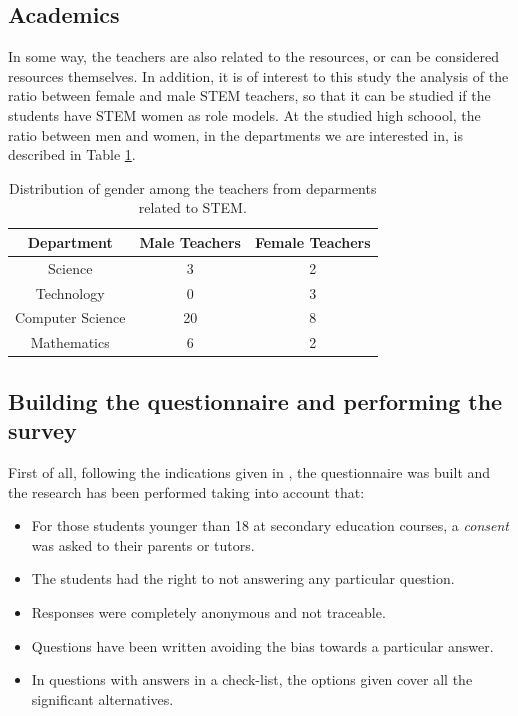 \documentclass[journal,transmag]{IEEEtran}
\begin{document}
\subsection{Academics}

In some way, the teachers are also related to the resources, or can be considered resources themselves. In addition, it is of interest to this study the analysis of the ratio between female and male STEM teachers, so that it can be studied if the students have STEM women as role models. At the studied high schoool, the ratio between men and women, in the departments we are interested in, is described in Table \ref{tab:teachers}.

\begin{table}
	\caption[Teachers in STEM departments]{Distribution of gender among the teachers from deparments related to STEM.}
	\label{tab:teachers}
	
	\begin{center}
		\begin{tabular}{|c|c|c|}
			\hline
			\textbf{Department} & \textbf{Male Teachers} & \textbf{Female Teachers} \\ \hline
			Science & 3 & 2 \\ \hline
			Technology & 0 & 3 \\ \hline
			Computer Science & 20 & 8 \\ \hline
			Mathematics & 6 & 2 \\
			\hline
		\end{tabular}
	\end{center}
\end{table}

\subsection{Building the questionnaire and performing the survey}

First of all, following the indications given in \cite{cohen2013research}, the questionnaire was built and the research has been performed taking into account that:

\begin{itemize}
  \item For those students younger than 18 at secondary education courses, a \textit{consent} was asked to their parents or tutors.
  \item The students had the right to not answering any particular question.
  \item Responses were completely anonymous and not traceable.
  \item Questions have been written avoiding the bias towards a particular answer.
  \item In questions with answers in a check-list, the options given cover all the significant alternatives.
\end{itemize}
\end{document}

